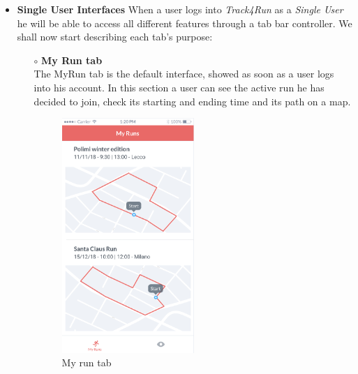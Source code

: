 \documentclass[titlepage]{article}
\begin{document}
\begin{itemize}
\begin{itemize}
				\item{\bf Single User Interfaces}
			When a user logs into {\it Track4Run} as a {\it Single User} he will be able to access all different features through a tab bar controller. We shall now start describing each tab’s purpose:
				\begin{itemize}
					\item[$\circ$] {\bf My Run tab} \\
					The MyRun tab is the default interface, showed as soon as a user logs into his account. In this section a user can see the active run he has decided to join, check its starting and ending time and its path on a map.\\
					\begin{figure}[H]
						\center
  						\includegraphics[width=5cm]{Mockup/mockupMyRunSU.png}
  						\caption{My run tab}
 					 	\label{fig:MyRun}
					\end{figure}


\end{itemize}
\end{itemize}
\end{itemize}
\end{document}
